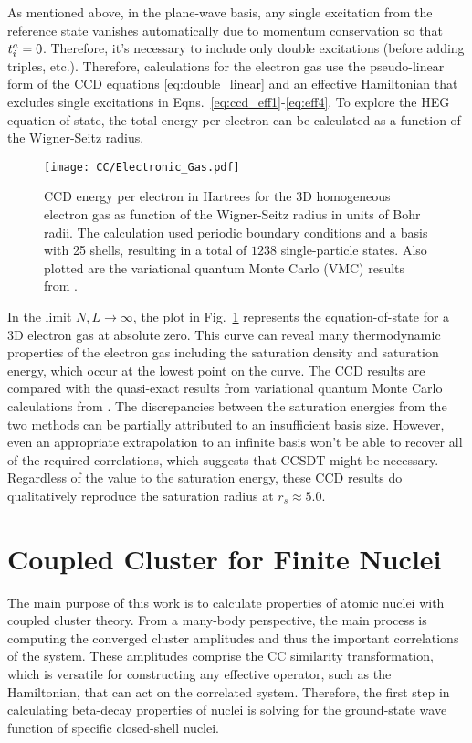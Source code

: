 \documentclass[thesis.tex]{subfiles}
\begin{document}
As mentioned above, in the plane-wave basis, any single excitation from the reference state vanishes automatically due to momentum conservation so that $t^{a}_{i} = 0$.  Therefore, it's necessary to include only double excitations (before adding triples, etc.).  Therefore, calculations for the electron gas use the pseudo-linear form of the CCD equations \eqref{eq:double_linear} and an effective Hamiltonian that excludes single excitations in Eqns.\ \eqref{eq:ccd_eff1}-\eqref{eq:eff4}.  To explore the HEG equation-of-state, the total energy per electron can be calculated as a function of the Wigner-Seitz radius.
\begin{figure}[h]
  \texttt{[image: CC/Electronic\_Gas.pdf]}
  \caption{CCD energy per electron in Hartrees for the 3D homogeneous electron gas as function of the Wigner-Seitz radius in units of Bohr radii. The calculation used periodic boundary conditions and a basis with 25 shells, resulting in a total of $1238$ single-particle states. Also plotted are the variational quantum Monte Carlo (VMC) results from \cite{LOPEZ2006}.}  
  \label{fig:Electronic_Gas}
\end{figure}
In the limit $N,L \rightarrow \infty$, the plot in Fig.\ \ref{fig:Electronic_Gas} represents the equation-of-state for a 3D electron gas at absolute zero.  This curve can reveal many thermodynamic properties of the electron gas including the saturation density and saturation energy, which occur at the lowest point on the curve.  The CCD results are compared with the quasi-exact results from variational quantum Monte Carlo calculations from \cite{LOPEZ2006}.  The discrepancies between the saturation energies from the two methods can be partially attributed to an insufficient basis size.  However, even an appropriate extrapolation to an infinite basis won't be able to recover all of the required correlations, which suggests that CCSDT might be necessary.  Regardless of the value to the saturation energy, these CCD results do qualitatively reproduce the saturation radius at $r_{s} \approx 5.0$.



\section{Coupled Cluster for Finite Nuclei} \label{section:cc_nuclei}

The main purpose of this work is to calculate properties of atomic nuclei with coupled cluster theory.  From a many-body perspective, the main process is computing the converged cluster amplitudes and thus the important correlations of the system.  These amplitudes comprise the CC similarity transformation, which is versatile for constructing any effective operator, such as the Hamiltonian, that can act on the correlated system.  Therefore, the first step in calculating beta-decay properties of nuclei is solving for the ground-state wave function of specific closed-shell nuclei.
\end{document}
